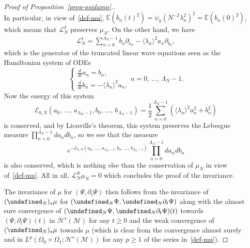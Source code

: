 \documentclass[10pt]{amsart}
\theoremstyle{definition}\newtheorem{defi}[theo]{Definition}\newtheorem{rema}[theo]{Remark}\newtheorem{exam}[theo]{Example}\newtheorem{exem}[theo]{Example}\newtheorem{nota}[theo]{Notation}
\newcommand{\E}{\mathbb{E}}
\let\P= \undefined
\newcommand{\P}{\mathbf{P}}
\newcommand{\En}{\mathcal{E}}
\renewcommand{\L}{\mathcal{L}}
\newcommand{\M}{\mathcal{M}}
\renewcommand{\H}{\mathcal{H}}
\newcommand{\Ld}{\Lambda}
\newcommand{\dt}{\partial_t}
\renewcommand{\O}{\Omega}
\newcommand{\jb}[1] {\langle #1 \rangle}
\begin{document}
\begin{proof}[Proof of Proposition~\ref{prop-psidamp}.]
\begin{equation*}
\end{equation*}
In particular, in view of~\eqref{def-mu}, $\E(b_n(t)^2)= \psi_0(N^{-2}\lambda_n^2)^2 = \E(b_n(0)^2) $, which means that $\L_N^2$ preserves $\mu_N$. On the other hand, we have
\begin{align*}
\L_N^1 = \sum_{n=0}^{\Ld_N-1}b_n\partial_{a_n}-\jb{\lambda_n}^2a_n\partial_{b_n},
\end{align*}
which is the generator of the truncated linear wave equations seen as the Hamiltonian system of ODEs
\begin{equation*}
\begin{cases}
\frac{d}{dt}a_n = b_n,\\
\frac{d}{dt}b_n = -\jb{\lambda_n}^2a_n,
\end{cases} n=0,\,\dots,\,\Ld_N-1.
\end{equation*}
Now the energy of this system
\begin{equation*}
\En_{0,N}\left(a_0,\,\dots,\,a_{\Ld_N-1},b_0,\,\dots,\,b_{\Ld_N-1}\right) = \frac12\sum_{n=0}^{\Ld_N-1}\left(\jb{\lambda_n}^2a_n^2+b_n^2\right)
\end{equation*}
is conserved, and by Liouville's theorem, this system preserves the Lebesgue measure $\prod_{n=0}^{\Ld_N-1}da_ndb_n$, so we see that the measure
\[
e^{-\En_{0,N}\left(a_0,\,\dots,\,a_{\Ld_N-1},b_0,\,\dots,\,b_{\Ld_N-1}\right)}\prod_{n=0}^{\Ld_N-1}da_ndb_n
\]
is also conserved, which is nothing else than the conservation of $\mu_N$ in view of~\eqref{def-mu}. All in all, $\L_N^\#\mu_N=0$ which concludes the proof of the invariance.

The invariance of $\mu$ for $(\Psi,\dt \Psi)$ then follows from the invariance of $(\P_N)_\star\mu$ for $(\P_N\Psi,\P_N\dt\Psi)$ along with the almost sure convergence of $(\P_N\Psi,\P_N\dt\Psi)(t)$ towards $(\Psi,\dt\Psi)(t)$ in $\H^s(\M)$ for any $t\ge 0$ and the weak convergence of $(\P_N)_\star\mu$ towards $\mu$ (which is clear from the convergence almost surely and in $L^p(\O_0\times\O_1;\H^s(\M))$ for any $p\ge 1$ of the series in~\eqref{def-mu}).


\end{proof}
\end{document}
